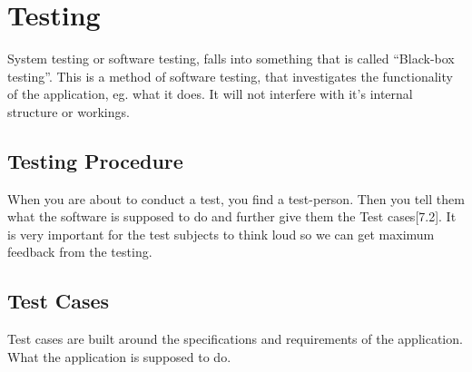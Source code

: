 
\section{Testing}
\thispagestyle{plain}
System testing or software testing, falls into something that is called “Black-box testing”. This is a method of software testing, that investigates the functionality of the application, eg. what it does. It will not interfere with it's internal structure or workings. 

\subsection{Testing Procedure}

When you are about to conduct a test, you find a test-person. Then you tell them what the software is supposed to do and further give them the Test cases[7.2]. It is very important for the test subjects to think loud so we can get maximum feedback from the testing. 

\subsection{Test Cases}

Test cases are built around the specifications and requirements of the application. What the application is supposed to do.  


